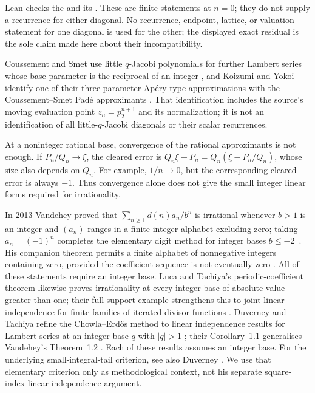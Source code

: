 \documentclass[11pt]{article}
\begin{document}
Lean checks the
 and its
.  These are finite statements at $n=0$; they do not supply a
recurrence for either diagonal.  No recurrence, endpoint, lattice, or
valuation statement for one diagonal is used for the other; the displayed
exact residual is the sole claim made here about their incompatibility.

Coussement and Smet use little $q$-Jacobi polynomials for further Lambert
series whose base parameter is the reciprocal of an integer
\cite[Thms.~1.2--1.3, p.~2; Sec.~2]{coussementsmet2007}, and Koizumi and
Yokoi identify one of their three-parameter Ap\'ery-type approximations with
the Coussement--Smet Pad\'e approximants
\cite[Sec.~7, Prop.~7.1, p.~33]{koizumiyokoi2026}.
That identification includes the source's moving evaluation point
$z_n=p_2^{n+1}$ and its normalization; it is not an identification of
all little-$q$-Jacobi diagonals or their scalar recurrences.

At a noninteger rational base, convergence of the rational approximants
is not enough. If $P_n/Q_n\to\xi$, the cleared error is
$Q_n\xi-P_n=Q_n(\xi-P_n/Q_n)$, whose size also depends on $Q_n$.
For example, $1/n\to0$, but the corresponding cleared error is always
$-1$. Thus convergence alone does not give the small integer linear
forms required for irrationality.

In 2013 Vandehey proved that
$\sum_{n\ge1}d(n)a_n/b^n$ is irrational whenever $b>1$ is an integer and
$(a_n)$ ranges in a finite integer alphabet excluding zero; taking
$a_n=(-1)^n$ completes the elementary digit method for integer bases
$b\le-2$~\cite[Thm.~1.2, p.~2]{vandehey2013}.  His companion theorem permits
a finite alphabet of nonnegative integers containing zero, provided the
coefficient sequence is not eventually zero
\cite[Thm.~1.1, p.~2]{vandehey2013}.  All
of these statements require an integer base. Luca and Tachiya's periodic-coefficient theorem
likewise proves irrationality at every integer base of absolute value greater
than one; their full-support example strengthens this to joint linear
independence for finite families of iterated divisor functions
\cite[Theorem~A, p.~139; Example~1, p.~140]{lucatachiya2017}.  Duverney and
Tachiya refine the Chowla--Erd\H{o}s method to linear independence results for
Lambert series at an integer base $q$ with $|q|>1$
\cite[Thms.~1.1--1.2, pp.~2--3]{duverneytachiya2019}; their Corollary~1.1
generalises Vandehey's Theorem~1.2 \cite[p.~3]{duverneytachiya2019}.  Each of these results assumes an integer base.
For the underlying small-integral-tail criterion, see also Duverney
\cite[Thm.~2, p.~4 of the author manuscript]{duverney2011}.
We use that elementary criterion only as methodological context, not his
separate square-index linear-independence argument.
\end{document}
